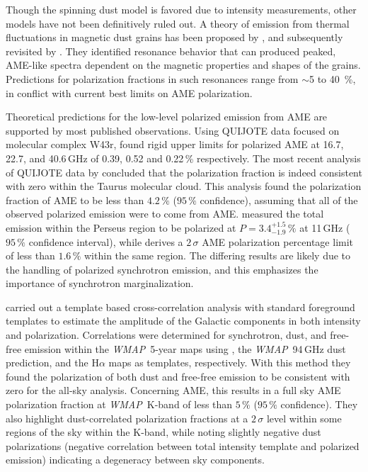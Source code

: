 \documentclass[twocolumn]{aa}
\def\WMAP{\textit{WMAP}}
\begin{document}
Though the spinning dust model is favored due to intensity measurements, other models have not been definitively ruled out. A theory of emission from thermal fluctuations in magnetic dust grains has been proposed by \cite{draine1999}, and subsequently revisited by \cite{draine2013}. They identified resonance behavior that can produced peaked, AME-like spectra dependent on the magnetic properties and shapes of the grains. Predictions for polarization fractions in such resonances range from $\sim$5 to 40~\%, in conflict with current best limits on AME polarization. 

Theoretical predictions for the low-level polarized emission from AME are supported by most published observations. Using QUIJOTE data focused on molecular complex W43r, \cite{QUIJOTE_II_2016} found rigid upper limits for polarized AME at 16.7, 22.7, and 40.6\,GHz of 0.39, 0.52 and 0.22\,\% respectively. The most recent analysis of QUIJOTE data by \cite{QUIJOTE_III} concluded that the polarization fraction is indeed consistent with zero  within the Taurus molecular cloud. This analysis found the polarization fraction of AME to be less than $4.2\,\%$ ($95\,\%$ confidence), assuming that all of the observed polarized emission were to come from AME. \cite{battistelli2006} measured the total emission within the Perseus region to be polarized at $P = 3.4^{+1.5}_{-1.9} \,\%$ at 11\,GHz ($95\,\%$ confidence interval), while  \cite{planck2014-a31} derives a $2\,\sigma$ AME polarization percentage limit of less than $ 1.6\,\%$ within the same region. The differing results are likely due to the handling of polarized synchrotron emission, and this emphasizes the importance of synchrotron marginalization.

\cite{Macellari_2011} carried out a template based cross-correlation analysis with standard foreground templates to estimate the amplitude of the Galactic components in both intensity and polarization. Correlations were determined for synchrotron, dust, and free-free emission within the \WMAP\ 5-year maps using \cite{haslam1982}, the \WMAP\ 94\,GHz dust prediction, and the \cite{finkbeiner2003} H$\alpha$ maps as templates, respectively. With this method they found the polarization of both dust and free-free emission to be consistent with zero for the all-sky analysis. Concerning AME, this results in a full sky AME polarization fraction at \WMAP\ K-band of less than $5\,\%$ ($95\,\%$ confidence). They also highlight dust-correlated polarization fractions at a $2\,\sigma$ level within some regions of the sky within the K-band, while noting slightly negative dust polarizations (negative correlation between total intensity template and polarized emission) indicating a degeneracy between sky components.
 
\end{document}
